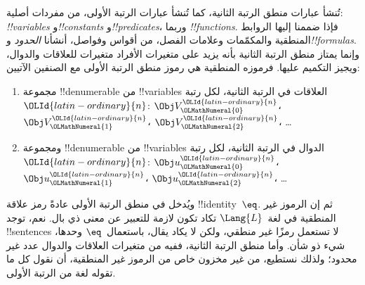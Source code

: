 \documentclass[../../../include/open-logic-section]{subfiles}
\begin{document}


تُنشأ عبارات منطق الرتبة الثانية، كما تُنشأ عبارات الرتبة الأولى، من
مفردات أصلية: \emph{!!{variable}s} و\emph{!!{constant}s}
و\emph{!!{predicate}s}، وربما \emph{!!{function}s}. فإذا ضممنا إليها
الروابط المنطقية والمكمّمات وعلامات الفصل، من أقواس وفواصل، أنشأنا
\emph{الحدود} و\emph{!!{formula}s}. وإنما يمتاز منطق الرتبة الثانية بأنه
يزيد على متغيرات الأفراد متغيرات للعلاقات والدوال، ويجيز التكميم عليها.
فرموزه المنطقية هي رموز منطق الرتبة الأولى مع الصنفين الآتيين:

\begin{enumerate}
\item مجموعة !!{denumerable} من !!{variable}s العلاقات في الرتبة الثانية،
  لكل رتبة~${\OLId{latin-ordinary}{n}}$: $\Obj V_{\OLMathNumeral{0}}^{\OLId{latin-ordinary}{n}}$، $\Obj V_{\OLMathNumeral{1}}^{\OLId{latin-ordinary}{n}}$، $\Obj V_{\OLMathNumeral{2}}^{\OLId{latin-ordinary}{n}}$، \dots
\item ومجموعة !!{denumerable} من !!{variable}s الدوال في الرتبة الثانية،
  لكل رتبة~${\OLId{latin-ordinary}{n}}$: $\Obj u_{\OLMathNumeral{0}}^{\OLId{latin-ordinary}{n}}$، $\Obj u_{\OLMathNumeral{1}}^{\OLId{latin-ordinary}{n}}$، $\Obj u_{\OLMathNumeral{2}}^{\OLId{latin-ordinary}{n}}$، \dots
\end{enumerate}

ويُدخل في منطق الرتبة الأولى عادةً رمز علاقة !!{identity}~$\eq$. ثم إن
الرموز غير المنطقية في لغة~$\Lang{L}$ تكاد تكون لازمة للتعبير عن معنى
ذي بال. نعم، توجد !!{sentence}s لا تستعمل رمزًا غير منطقي، ولكن لا يكاد
يقال، باستعمال~$\eq$ وحدها، شيء ذو شأن. وأما منطق الرتبة الثانية، ففيه
من متغيرات العلاقات والدوال عدد غير محدود؛ ولذلك نستطيع، من غير مخزون
خاص من الرموز غير المنطقية، أن نقول كل ما تقوله لغة من الرتبة الأولى.
\end{document}
